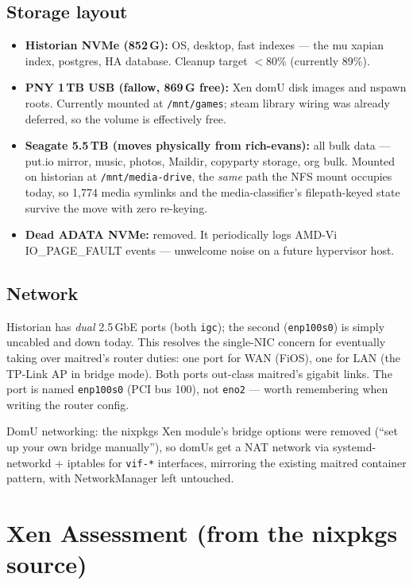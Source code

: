 \documentclass[11pt,letterpaper,headings=small]{scrartcl}
\begin{document}
\subsection{Storage layout}

\begin{itemize}
  \item \textbf{Historian NVMe (852\,G):} OS, desktop, fast indexes ---
        the mu xapian index, postgres, HA database. Cleanup target
        $<$80\% (currently 89\%).
  \item \textbf{PNY 1\,TB USB (fallow, 869\,G free):} Xen domU disk
        images and nspawn roots. Currently mounted at
        \texttt{/mnt/games}; steam library wiring was already deferred,
        so the volume is effectively free.
  \item \textbf{Seagate 5.5\,TB (moves physically from rich-evans):}
        all bulk data --- put.io mirror, music, photos, Maildir,
        copyparty storage, org bulk. Mounted on historian at
        \texttt{/mnt/media-drive}, the \emph{same} path the NFS mount
        occupies today, so 1{,}774 media symlinks and the
        media-classifier's filepath-keyed state survive the move with
        zero re-keying.
  \item \textbf{Dead ADATA NVMe:} removed. It periodically logs AMD-Vi
        IO\_PAGE\_FAULT events --- unwelcome noise on a future
        hypervisor host.
\end{itemize}

\subsection{Network}

Historian has \emph{dual} 2.5\,GbE ports (both \texttt{igc}); the second
(\texttt{enp100s0}) is simply uncabled and down today. This resolves the
single-NIC concern for eventually taking over maitred's router duties:
one port for WAN (FiOS), one for LAN (the TP-Link AP in bridge mode).
Both ports out-class maitred's gigabit links. The port is named
\texttt{enp100s0} (PCI bus 100), not \texttt{eno2} --- worth remembering
when writing the router config.

DomU networking: the nixpkgs Xen module's bridge options were removed
(``set up your own bridge manually''), so domUs get a NAT network via
systemd-networkd + iptables for \texttt{vif-*} interfaces, mirroring the
existing maitred container pattern, with NetworkManager left untouched.

\section{Xen Assessment (from the nixpkgs source)}
\end{document}
